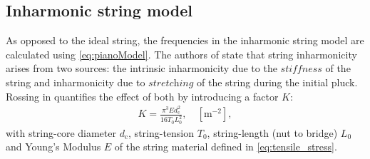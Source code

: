 \documentclass{article}
\begin{document}
\begin{sloppy}
\section{Inharmonic string model} \label{sec:string_model}

As opposed to the ideal string, the frequencies in the inharmonic string model are calculated using \eqref{eq:pianoModel}. The authors of \cite{coltShank} state that string inharmonicity arises from two sources: the intrinsic inharmonicity due to the $\textit{stiffness}$ of the string and inharmonicity due to $\textit{stretching}$ of the string during the initial pluck. Rossing in \cite{rossing:science_of_string_instruments} quantifies the effect of both by introducing a factor $K$:
\begin{align}
    K = \frac {\pi^3 E d_\text{c}^2}{16 T_0 L_0^2}, \quad [\text{m}^{-2}],
\end{align}
with string-core diameter $d_\text{c}$, string-tension $T_0$, string-length (nut to bridge) $L_0$ and Young's Modulus $E$ of the string material defined in \eqref{eq:tensile_stress}.


\end{sloppy}
\end{document}
